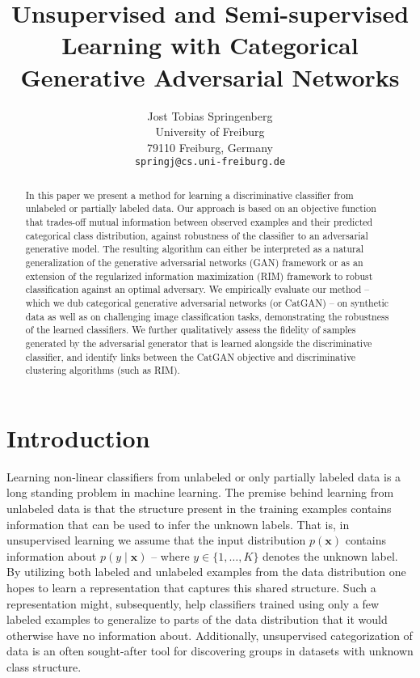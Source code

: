 \documentclass{article} \usepackage{iclr2016_conference,times}
\title{Unsupervised and Semi-supervised Learning with Categorical Generative Adversarial Networks}
\author{Jost Tobias Springenberg \\
University of Freiburg \\
79110 Freiburg, Germany\\
\texttt{springj@cs.uni-freiburg.de} \\
}
\newcommand{\bx}{\mathbf{x}}
\begin{document}
\maketitle

\begin{abstract}
  In this paper we present a method for learning a discriminative
  classifier from unlabeled or partially labeled data.  Our approach
  is based on an objective function that trades-off mutual
  information between observed examples and their predicted
  categorical class distribution, against robustness of the classifier
  to an adversarial generative model. The resulting algorithm can
  either be interpreted as a natural generalization of the generative
  adversarial networks (GAN) framework or as an extension of the
  regularized information maximization (RIM) framework to robust
  classification against an optimal adversary.  We empirically
  evaluate our method -- which we dub categorical generative
  adversarial networks (or CatGAN) -- on synthetic data as well as on
  challenging image classification tasks, demonstrating the robustness
  of the learned classifiers.  We further qualitatively assess the
  fidelity of samples generated by the adversarial generator that is
  learned alongside the discriminative classifier, and identify links
  between the CatGAN objective and discriminative clustering
  algorithms (such as RIM).
\end{abstract}

\section{Introduction}
Learning non-linear classifiers from unlabeled or only partially
labeled data is a long standing problem in machine learning. The
premise behind learning from unlabeled data is that the structure
present in the training examples contains information that can be used
to infer the unknown labels. That is, in unsupervised learning we
assume that the input distribution $p(\bx)$ contains information about
$p(y \mid \bx)$ -- where $y \in \lbrace 1, \dots, K \rbrace$ denotes
the unknown label.  By utilizing both labeled and unlabeled examples
from the data distribution one hopes to learn a representation that
captures this shared structure. Such a representation might,
subsequently, help classifiers trained using only a few labeled
examples to generalize to parts of the data distribution that it would
otherwise have no information about. Additionally, unsupervised
categorization of data is an often sought-after tool for discovering
groups in datasets with unknown class structure.
\end{document}

